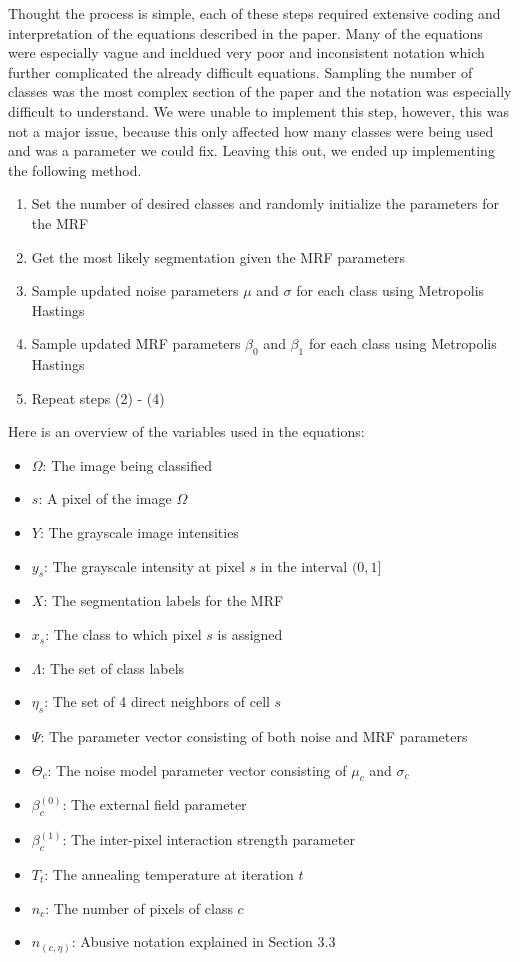 \documentclass[11pt]{article}
\begin{document}
Thought the process is simple, each of these steps required extensive coding and interpretation of the equations described in the paper.
Many of the equations were especially vague and incldued very poor and inconsistent notation which further complicated the already difficult equations.
Sampling the number of classes was the most complex section of the paper and the notation was especially difficult to understand.
We were unable to implement this step, however, this was not a major issue, because this only affected how many classes were being used and was a parameter we could fix.
Leaving this out, we ended up implementing the following method.

\begin{enumerate}
	\item Set the number of desired classes and randomly initialize the parameters for the MRF
	\item Get the most likely segmentation given the MRF parameters
	\item Sample updated noise parameters $\mu$ and $\sigma$ for each class using Metropolis Hastings
	\item Sample updated MRF parameters $\beta_0$ and $\beta_1$ for each class using Metropolis Hastings
	\item Repeat steps (2) - (4)
\end{enumerate}


Here is an overview of the variables used in the equations:

\begin{itemize}
	\item $\Omega$: The image being classified
	\item $s$: A pixel of the image $\Omega$
	\item $Y$: The grayscale image intensities
	\item $y_{s}$: The grayscale intensity at pixel $s$ in the interval $(0,1]$
	\item $X$: The segmentation labels for the MRF
	\item $x_{s}$: The class to which pixel $s$ is assigned
	\item $\Lambda$: The set of class labels
	\item $\eta_{s}$: The set of 4 direct neighbors of cell $s$
	\item $\Psi$: The parameter vector consisting of both noise and MRF parameters
	\item $\Theta_{c}$: The noise model parameter vector consisting of $\mu_{c}$ and $\sigma_{c}$
	\item $\beta_{c}^{(0)}$: The external field parameter
	\item $\beta_{c}^{(1)}$: The inter-pixel interaction strength parameter
	\item $T_{t}$: The annealing temperature at iteration $t$
	\item $n_{c}$: The number of pixels of class $c$
	\item $n_{(c, \eta)}$: Abusive notation explained in Section 3.3
\end{itemize}
\end{document}
